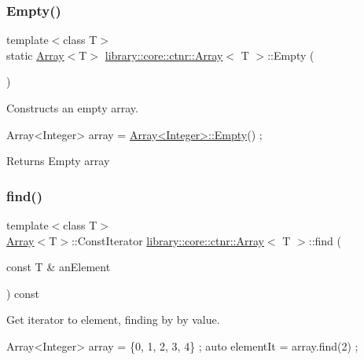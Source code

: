 \subsubsection{\texorpdfstring{Empty()}{Empty()}}
{\footnotesize\ttfamily template$<$class T$>$ \\
static \hyperlink{classlibrary_1_1core_1_1ctnr_1_1_array}{Array}$<$T$>$ \hyperlink{classlibrary_1_1core_1_1ctnr_1_1_array}{library\+::core\+::ctnr\+::\+Array}$<$ T $>$\+::Empty (\begin{DoxyParamCaption}{ }\end{DoxyParamCaption})\hspace{0.3cm}{\ttfamily [static]}}



Constructs an empty array. 


\begin{DoxyCode}
Array<Integer> array = \hyperlink{classlibrary_1_1core_1_1ctnr_1_1_array_a7795ee997ae6008cd0bc8db607315524}{Array<Integer>::Empty}() ;
\end{DoxyCode}


\begin{DoxyReturn}{Returns}
Empty array 
\end{DoxyReturn}
\mbox{\label{classlibrary_1_1core_1_1ctnr_1_1_array_aeb8ed38b67b6031e27c188d89bd5cbbf}} 
\subsubsection{\texorpdfstring{find()}{find()}\hspace{0.1cm}{\footnotesize\ttfamily [1/2]}}
{\footnotesize\ttfamily template$<$class T$>$ \\
\hyperlink{classlibrary_1_1core_1_1ctnr_1_1_array}{Array}$<$T$>$\+::Const\+Iterator \hyperlink{classlibrary_1_1core_1_1ctnr_1_1_array}{library\+::core\+::ctnr\+::\+Array}$<$ T $>$\+::find (\begin{DoxyParamCaption}\item[{const T \&}]{an\+Element }\end{DoxyParamCaption}) const}



Get iterator to element, finding by by value. 


\begin{DoxyCode}
Array<Integer> array = \{0, 1, 2, 3, 4\} ;
\textcolor{keyword}{auto} elementIt = array.find(2) ;
\end{DoxyCode}



